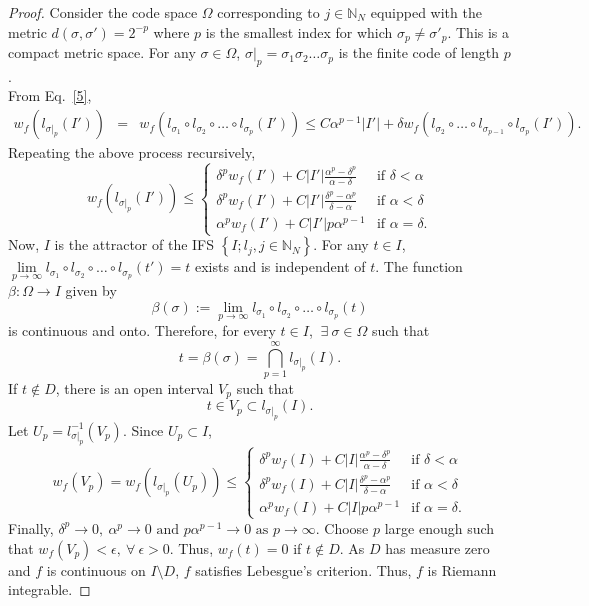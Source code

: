 \documentclass[sn-mathphys-num]{sn-jnl}
\numberwithin{equation}{section}
\begin{document}
\begin{proof}
Consider the code space $\Omega$ corresponding to $j\in\mathbb N_N$ equipped with the metric $d(\sigma,\sigma')=2^{-p}$ where $p$ is the smallest index for which $\sigma_p\neq\sigma'_p$. This is a compact metric space.  For any $\sigma\in \Omega$, $\sigma|_p=\sigma_1\sigma_2\ldots\sigma_p$ is the finite code of length $p$.\\ From Eq.~\eqref{5},
\begin{eqnarray}\nonumber
w_f(l_{\sigma|_p}(I'))&=&w_f(l_{\sigma_1}\circ l_{\sigma_2}\circ\ldots \circ l_{\sigma_p}(I'))\leq C\alpha^{p-1}|I'|+\delta w_f(l_{\sigma_2}\circ\ldots \circ l_{\sigma_{p-1}}\circ l_{\sigma_p}(I')).\label{osci}
\end{eqnarray}
Repeating the above process recursively,
\begin{equation*}
w_f(l_{\sigma|_p}(I')) \leq 
\begin{cases}
\delta^pw_f(I')+C|I'|\frac{\alpha^p-\delta^p}{\alpha-\delta} & \text{if } \delta<\alpha\\
\delta^pw_f(I')+C|I'|\frac{\delta^p-\alpha^p}{\delta-\alpha} & \text{if } \alpha<\delta\\
\alpha^pw_f(I')+C|I'|p\alpha^{p-1} & \text{if } \alpha=\delta.
\end{cases}
\end{equation*}
Now, $I$ is the attractor of the IFS $\left\{I;l_j,j\in\mathbb N_N\right\}$. For any $t\in I$, $\lim\limits_{p\rightarrow\infty}l_{\sigma_1}\circ l_{\sigma_2}\circ \ldots \circ l_{\sigma_p}(t')=t$ exists and is independent of $t$. The function $\beta:\Omega\rightarrow I$ given by
\begin{equation*}
\beta(\sigma):=\lim_{p\rightarrow\infty}l_{\sigma_1}\circ l_{\sigma_2}\circ \ldots \circ l_{\sigma_p}(t)
\end{equation*}
is continuous and onto. Therefore, for every $t\in I$, $\ \exists\ \sigma\in \Omega$ such that
\begin{equation*}
t=\beta(\sigma)=\bigcap\limits_{p=1}^\infty l_{\sigma|_p}(I).
\end{equation*} 
If $t\notin D$, there is an open interval $V_p$ such that 
\begin{equation*}
t\in V_p \subset l_{\sigma|_p}(I).
\end{equation*}
Let $U_p=l_{\sigma|_p}^{-1}(V_p)$. Since $U_p\subset I$,
\begin{equation}
w_f(V_p)=w_f(l_{\sigma|_p}(U_p))\leq
\begin{cases}\label{oscicases}
\delta^pw_f(I)+C|I|\frac{\alpha^p-\delta^p}{\alpha-\delta} & \text{if } \delta<\alpha\\
\delta^pw_f(I)+C|I|\frac{\delta^p-\alpha^p}{\delta-\alpha} & \text{if } \alpha<\delta\\
\alpha^pw_f(I)+C|I|p\alpha^{p-1} & \text{if } \alpha=\delta.		\end{cases}
\end{equation}
Finally, $ \delta^p\rightarrow 0,\ \alpha^p\rightarrow 0\text{ and } p\alpha^{p-1}\rightarrow 0\text{ as } p\rightarrow\infty $. Choose $p$ large enough such that $w_f(V_p)<\epsilon, \ \forall\ \epsilon>0.$ Thus, $w_f(t)=0$ if $t\notin D$. As $D$ has measure zero and $f$ is continuous on $I\setminus D$, $f$ satisfies Lebesgue's criterion. Thus, $f$ is
Riemann integrable.
\end{proof}	
\end{document}

